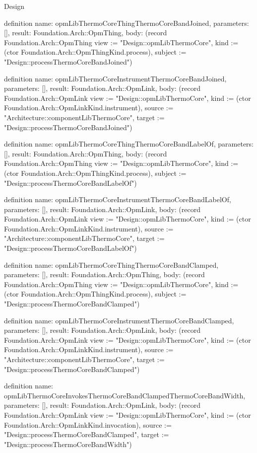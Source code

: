 \begin{lexlean}{Design}
\begin{semanticmodule}
definition{
  name: opmLibThermoCoreThingThermoCoreBandJoined,
  parameters: [],
  result: Foundation.Arch::OpmThing,
  body: (record Foundation.Arch::OpmThing {view := "Design::opmLibThermoCore", kind := (ctor Foundation.Arch::OpmThingKind.process), subject := "Design::processThermoCoreBandJoined"})
}

definition{
  name: opmLibThermoCoreInstrumentThermoCoreBandJoined,
  parameters: [],
  result: Foundation.Arch::OpmLink,
  body: (record Foundation.Arch::OpmLink {view := "Design::opmLibThermoCore", kind := (ctor Foundation.Arch::OpmLinkKind.instrument), source := "Architecture::componentLibThermoCore", target := "Design::processThermoCoreBandJoined"})
}

definition{
  name: opmLibThermoCoreThingThermoCoreBandLabelOf,
  parameters: [],
  result: Foundation.Arch::OpmThing,
  body: (record Foundation.Arch::OpmThing {view := "Design::opmLibThermoCore", kind := (ctor Foundation.Arch::OpmThingKind.process), subject := "Design::processThermoCoreBandLabelOf"})
}

definition{
  name: opmLibThermoCoreInstrumentThermoCoreBandLabelOf,
  parameters: [],
  result: Foundation.Arch::OpmLink,
  body: (record Foundation.Arch::OpmLink {view := "Design::opmLibThermoCore", kind := (ctor Foundation.Arch::OpmLinkKind.instrument), source := "Architecture::componentLibThermoCore", target := "Design::processThermoCoreBandLabelOf"})
}

definition{
  name: opmLibThermoCoreThingThermoCoreBandClamped,
  parameters: [],
  result: Foundation.Arch::OpmThing,
  body: (record Foundation.Arch::OpmThing {view := "Design::opmLibThermoCore", kind := (ctor Foundation.Arch::OpmThingKind.process), subject := "Design::processThermoCoreBandClamped"})
}

definition{
  name: opmLibThermoCoreInstrumentThermoCoreBandClamped,
  parameters: [],
  result: Foundation.Arch::OpmLink,
  body: (record Foundation.Arch::OpmLink {view := "Design::opmLibThermoCore", kind := (ctor Foundation.Arch::OpmLinkKind.instrument), source := "Architecture::componentLibThermoCore", target := "Design::processThermoCoreBandClamped"})
}

definition{
  name: opmLibThermoCoreInvokesThermoCoreBandClampedThermoCoreBandWidth,
  parameters: [],
  result: Foundation.Arch::OpmLink,
  body: (record Foundation.Arch::OpmLink {view := "Design::opmLibThermoCore", kind := (ctor Foundation.Arch::OpmLinkKind.invocation), source := "Design::processThermoCoreBandClamped", target := "Design::processThermoCoreBandWidth"})
}


\end{semanticmodule}
\end{lexlean}
